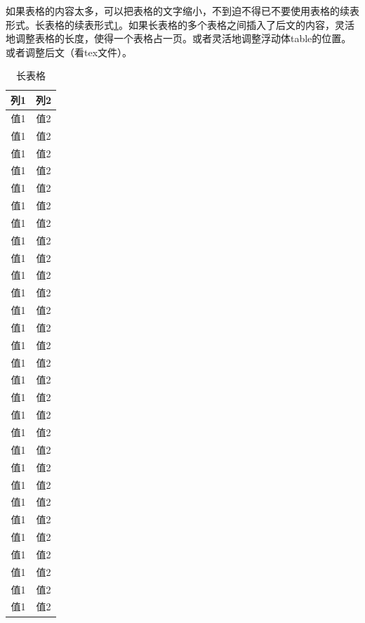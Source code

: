     如果表格的内容太多，可以把表格的文字缩小，不到迫不得已不要使用表格的续表形式。长表格的续表形式\ref{tab:long_table1}。如果长表格的多个表格之间插入了后文的内容，灵活地调整表格的长度，使得一个表格占一页。或者灵活地调整浮动体table的位置。或者调整后文（看tex文件）。
    \begin{table}[!t]
        \centering
        \caption{长表格}
        \label{tab:long_table1}
        \begin{tabular}{c c}
            \toprule[1.5bp]
            列1 & 列2 \\
            \midrule[0.75bp]
            值1 & 值2 \\
            值1 & 值2 \\
            值1 & 值2 \\
            值1 & 值2 \\
            值1 & 值2 \\
            值1 & 值2 \\
            值1 & 值2 \\
            值1 & 值2 \\
            值1 & 值2 \\
            值1 & 值2 \\
            值1 & 值2 \\
            值1 & 值2 \\
            值1 & 值2 \\
            值1 & 值2 \\
            值1 & 值2 \\
            值1 & 值2 \\
            值1 & 值2 \\
            值1 & 值2 \\
            值1 & 值2 \\
            值1 & 值2 \\
            值1 & 值2 \\
            值1 & 值2 \\
            值1 & 值2 \\
            值1 & 值2 \\
            值1 & 值2 \\
            值1 & 值2 \\
            值1 & 值2 \\
            值1 & 值2 \\
            值1 & 值2 \\
            \bottomrule[1.5bp]
        \end{tabular}
    \end{table}

